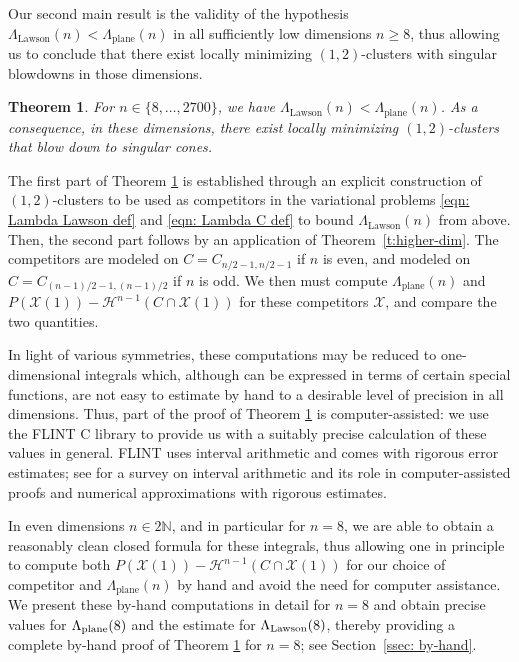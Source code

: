 \documentclass[10pt,reqno]{amsart}
\numberwithin{equation}{section}
\newtheorem{theorem}{Theorem}[section]
\theoremstyle{definition}
\newcommand{\Hcal}{\mathcal{H}}
\newcommand{\N}{\mathbb{N}}
\DeclareMathOperator{\Lawson}{Lawson}
\DeclareMathOperator{\plane}{plane}
\newcommand{\X}{\mathcal{X}}
\begin{document}
Our second main result is the validity of the hypothesis $\Lambda_{\Lawson}(n) < \Lambda_{\plane}(n)$ in {all sufficiently low dimensions $n \geq 8$}, thus allowing us to conclude that there exist locally minimizing $(1,2)$-clusters with singular blowdowns in those dimensions.

\begin{theorem}\label{t:Simons-vs-lens}
    For $n \in \{8,\dots, 2700\}$, we have $\Lambda_{\Lawson}(n) < \Lambda_{\plane}(n)$. 
    As a consequence, in these dimensions, there exist locally minimizing $(1,2)$-clusters that blow down to singular cones.
\end{theorem}
The first part of Theorem \ref{t:Simons-vs-lens} is established through an explicit construction of $(1,2)$-clusters to be used as competitors in the variational problems \eqref{eqn: Lambda Lawson def} and \eqref{eqn: Lambda C def}
to bound $\Lambda_{\Lawson}(n)$ from above. Then, the second part follows by an application of Theorem~\ref{t:higher-dim}.
The competitors are modeled on $C=C_{n/2-1,n/2-1}$ if $n$ is even, and modeled on $C=C_{(n-1)/2-1,(n-1)/2}$ if $n$ is odd. 
We then must compute $\Lambda_{\plane}(n)$ and  $P(\X(1))-\Hcal^{n-1}(C\cap\X(1))$ for these competitors $\X$, and compare the two quantities.
\medskip




In light of various symmetries, these computations may be reduced to one-dimensional integrals which, although can be expressed in terms of certain special functions, are not easy to estimate by hand to a desirable level of precision in all dimensions. Thus, part of the proof of Theorem \ref{t:Simons-vs-lens} is computer-assisted: we use the FLINT C library to provide us with a suitably precise calculation of these values in general. FLINT uses interval arithmetic and comes with rigorous error estimates; see \cite{GomezSerrano2019} for a survey on interval arithmetic and its role in computer-assisted proofs and numerical approximations with rigorous estimates.
\medskip


In even dimensions $n\in 2\N$, and in particular for $n=8$, we are able to obtain a reasonably clean closed formula for these integrals, thus allowing one in principle to compute both $P(\X(1))-\Hcal^{n-1}(C\cap\X(1))$ for our choice of competitor and $\Lambda_{\plane}(n)$ by hand {and avoid the need for computer assistance. We present these by-hand computations in detail for $n=8$ and obtain precise values for $\Lambda_{\rm plane}(8)$ and the estimate for $\Lambda_{\rm Lawson}(8)$, thereby providing a complete by-hand proof of Theorem \ref{t:Simons-vs-lens} for $n=8$; see Section~\ref{ssec: by-hand}}. 
\medskip
\end{document}
